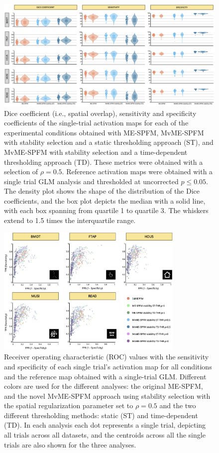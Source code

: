 \begin{figure}[ht!]
    \centerline{\includegraphics[width=\textwidth]{figures/multivariate/dice.png}}
    \caption{Dice coefficient (i.e., spatial overlap), sensitivity and
    specificity coefficients of the single-trial activation maps for each of the
    experimental conditions obtained with ME-SPFM, MvME-SPFM with stability
    selection and a static thresholding approach (ST), and MvME-SPFM with
    stability selection and a time-dependent thresholding approach (TD). These
    metrics were obtained with a selection of $\rho = 0.5$. Reference activation
    maps were obtained with a single trial GLM analysis and thresholded at
    uncorrected $p \leq 0.05$. The density plot shows the shape of the
    distribution of the Dice coefficients, and the box plot depicts the median
    with a solid line, with each box spanning from quartile 1 to quartile 3. The
    whiskers extend to 1.5 times the interquartile range.}
\label{fig:dice}
\end{figure}

\begin{figure}[ht!]
    \centerline{\includegraphics[width=0.8\textwidth]{figures/multivariate/roc.jpg}}
    \caption{Receiver operating characteristic (ROC) values with the sensitivity
    and specificity of each single trial's activation map for all conditions and
    the reference map obtained with a single-trial GLM. Different colors are
    used for the different analyses: the original ME-SPFM, and the novel
    MvME-SPFM approach using stability selection with the spatial regularization
    parameter set to $\rho=0.5$ and the two different thresholding methods:
    static (ST) and time-dependent (TD). In each analysis each dot represents a
    single trial, depicting all trials across all datasets, and the centroids
    across all the single trials are also shown for the three analyses.}
\label{fig:roc}
\end{figure}

